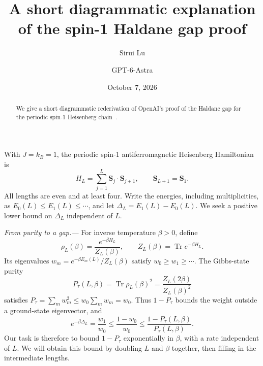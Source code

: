 \documentclass[aps,prl,reprint,amsmath,amssymb,nofootinbib,raggedbottom]{revtex4-2}
\newcommand{\Tr}{\operatorname{Tr}}
\newcommand{\Pt}{P_{\tau}}
\begin{document}
\title{A short diagrammatic explanation of the spin-1 Haldane gap proof}
\author{Sirui Lu}
\author{GPT-6-Astra}
\date{October 7, 2026}
\begin{abstract}
We give a short diagrammatic rederivation of OpenAI's proof of the
Haldane gap for the periodic spin-1 Heisenberg chain~\cite{source}.
\end{abstract}
\maketitle
\setlength{\abovedisplayskip}{5pt plus 2pt minus 1pt}
\setlength{\belowdisplayskip}{5pt plus 2pt minus 1pt}

With $J=k_B=1$, the periodic spin-1 antiferromagnetic Heisenberg
Hamiltonian is
\begin{equation}
 H_L=\sum_{j=1}^L\bm S_j\cdot\bm S_{j+1},\qquad
 \bm S_{L+1}=\bm S_1.
 \label{eq:model}
\end{equation}
All lengths are even and at least four. Write the energies, including
multiplicities, as $E_0(L)\le E_1(L)\le\cdots$, and let
$\Delta_L=E_1(L)-E_0(L)$. We seek a positive lower bound on $\Delta_L$
independent of $L$.

\emph{From purity to a gap.---}
For inverse temperature $\beta>0$, define
\begin{equation}
 \rho_L(\beta)=\frac{e^{-\beta H_L}}{Z_L(\beta)},\qquad
 Z_L(\beta)=\Tr e^{-\beta H_L}.
 \label{eq:gibbs}
\end{equation}
Its eigenvalues $w_m=e^{-\beta E_m(L)}/Z_L(\beta)$ satisfy
$w_0\ge w_1\ge\cdots$. The Gibbs-state purity
\begin{equation}
 \Pt(L,\beta)=\Tr\rho_L(\beta)^2
 =\frac{Z_L(2\beta)}{Z_L(\beta)^2}
 \label{eq:thermalpurity}
\end{equation}
satisfies $\Pt=\sum_m w_m^2\le w_0\sum_m w_m=w_0$.
Thus $1-\Pt$ bounds the weight outside a ground-state eigenvector, and
\begin{equation}
 e^{-\beta\Delta_L}=\frac{w_1}{w_0}
 \le\frac{1-w_0}{w_0}\le\frac{1-\Pt(L,\beta)}{\Pt(L,\beta)}.
 \label{eq:target}
\end{equation}
Our task is therefore to bound $1-\Pt$ exponentially in $\beta$, with a
rate independent of $L$. We will obtain this bound by doubling $L$ and
$\beta$ together, then filling in the intermediate lengths.
\end{document}
